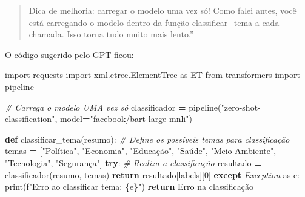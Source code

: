 \documentclass[
]{article}
\newenvironment{Shaded}{\begin{snugshade}}{\end{snugshade}}
\newcommand{\BuiltInTok}[1]{#1}
\newcommand{\CommentTok}[1]{\textcolor[rgb]{0.56,0.35,0.01}{\textit{#1}}}
\newcommand{\ControlFlowTok}[1]{\textcolor[rgb]{0.13,0.29,0.53}{\textbf{#1}}}
\newcommand{\DecValTok}[1]{\textcolor[rgb]{0.00,0.00,0.81}{#1}}
\newcommand{\ImportTok}[1]{#1}
\newcommand{\KeywordTok}[1]{\textcolor[rgb]{0.13,0.29,0.53}{\textbf{#1}}}
\newcommand{\NormalTok}[1]{#1}
\newcommand{\OperatorTok}[1]{\textcolor[rgb]{0.81,0.36,0.00}{\textbf{#1}}}
\newcommand{\PreprocessorTok}[1]{\textcolor[rgb]{0.56,0.35,0.01}{\textit{#1}}}
\newcommand{\SpecialCharTok}[1]{\textcolor[rgb]{0.81,0.36,0.00}{\textbf{#1}}}
\newcommand{\SpecialStringTok}[1]{\textcolor[rgb]{0.31,0.60,0.02}{#1}}
\newcommand{\StringTok}[1]{\textcolor[rgb]{0.31,0.60,0.02}{#1}}
\begin{document}
\begin{quote}
Dica de melhoria: carregar o modelo uma vez só! Como falei antes, você
está carregando o modelo dentro da função classificar\_tema a cada
chamada. Isso torna tudo muito mais lento.''
\end{quote}

O código sugerido pelo GPT ficou:

\begin{Shaded}
\begin{Highlighting}[]
\ImportTok{import}\NormalTok{ requests}
\ImportTok{import}\NormalTok{ xml.etree.ElementTree }\ImportTok{as}\NormalTok{ ET}
\ImportTok{from}\NormalTok{ transformers }\ImportTok{import}\NormalTok{ pipeline}

\CommentTok{\#  Carrega o modelo UMA vez só}
\NormalTok{classificador }\OperatorTok{=}\NormalTok{ pipeline(}\StringTok{"zero{-}shot{-}classification"}\NormalTok{, model}\OperatorTok{=}\StringTok{"facebook/bart{-}large{-}mnli"}\NormalTok{)}

\KeywordTok{def}\NormalTok{ classificar\_tema(resumo):}
    \CommentTok{\# Define os possíveis temas para classificação}
\NormalTok{    temas }\OperatorTok{=}\NormalTok{ [}\StringTok{"Política"}\NormalTok{, }\StringTok{"Economia"}\NormalTok{, }\StringTok{"Educação"}\NormalTok{, }\StringTok{"Saúde"}\NormalTok{, }\StringTok{"Meio Ambiente"}\NormalTok{, }\StringTok{"Tecnologia"}\NormalTok{, }\StringTok{"Segurança"}\NormalTok{]}
    \ControlFlowTok{try}\NormalTok{:}
        \CommentTok{\# Realiza a classificação}
\NormalTok{        resultado }\OperatorTok{=}\NormalTok{ classificador(resumo, temas)}
        \ControlFlowTok{return}\NormalTok{ resultado[}\StringTok{\textquotesingle{}labels\textquotesingle{}}\NormalTok{][}\DecValTok{0}\NormalTok{]}
    \ControlFlowTok{except} \PreprocessorTok{Exception} \ImportTok{as}\NormalTok{ e:}
        \BuiltInTok{print}\NormalTok{(}\SpecialStringTok{f"Erro ao classificar tema: }\SpecialCharTok{\{}\NormalTok{e}\SpecialCharTok{\}}\SpecialStringTok{"}\NormalTok{)}
        \ControlFlowTok{return} \StringTok{\textquotesingle{}Erro na classificação\textquotesingle{}}


\end{Highlighting}
\end{Shaded}
\end{document}
